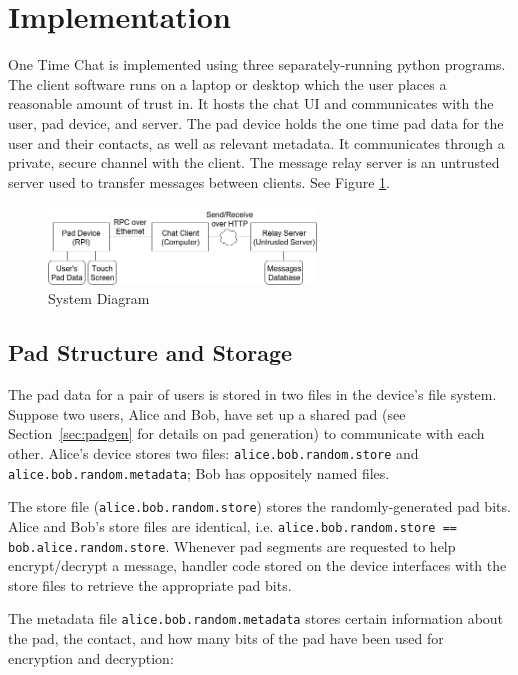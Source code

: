 \documentclass[twocolumn]{article}
\begin{document}

\section{Implementation}
One Time Chat is implemented using three separately-running python programs.
The client software runs on a laptop or desktop which the user places a reasonable amount of trust in. It hosts the chat UI and communicates with the user, pad device, and server.
The pad device holds the one time pad data for the user and their contacts, as well as relevant metadata. It communicates through a private, secure channel with the client.
The message relay server is an untrusted server used to transfer messages between clients. See Figure \ref{fig:systemd}.

\begin{figure}[htp]
\centering
\includegraphics[width=2.8in]{system-diagram}
\caption{System Diagram}
\label{fig:systemd}
\end{figure}

\subsection{Pad Structure and Storage}
\label{sec:padstruc}
The pad data for a pair of users is stored in two files in the device's file system. Suppose two users, Alice and Bob, have set up a shared pad (see Section~\ref{sec:padgen} for details on pad generation) to communicate with each other. Alice's device stores two files: \texttt{alice.bob.random.store} and \texttt{alice.bob.random.metadata}; Bob has oppositely named files.

The store file (\texttt{alice.bob.random.store}) stores the randomly-generated pad bits. Alice and Bob's store files are identical, i.e.
\texttt{alice.bob.random.store == bob.alice.random.store}. Whenever pad segments are requested to help encrypt/decrypt a message, handler code stored on the device interfaces with the store files to retrieve the appropriate pad bits.

The metadata file \texttt{alice.bob.random.metadata} stores certain information about the pad, the contact, and how many bits of the pad have been used for encryption and decryption:
\end{document}
